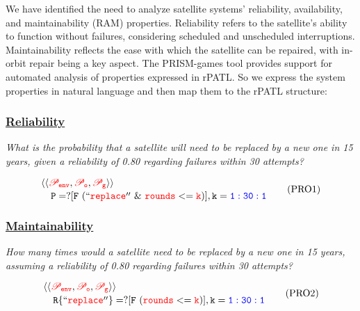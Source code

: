 We have identified the need to analyze satellite systems' reliability, availability, and maintainability (RAM) properties. Reliability refers to the satellite's ability to function without failures, considering scheduled and unscheduled interruptions. Maintainability reflects the ease with which the satellite can be repaired, with in-orbit repair being a key aspect.  The PRISM-games tool provides support for automated analysis of properties expressed in rPATL. So we express the system properties in natural language and then map them to the rPATL structure:

\subsubsection{\underline{Reliability}} 

\emph{What is the probability that a satellite will need to be replaced by a new one in 15 years, given a reliability of 0.80 regarding failures within 30 attempts?}

	   
	    \begin{resp}{}
             \begin{equation}
             \splitdfrac{\mathtt{  \langle\langle\textcolor{red}{\mathcal{P}_{env}}, \textcolor{red}{\mathcal{P}_{o}}, \textcolor{red}{\mathcal{P}_{g}}} \rangle\rangle}{ \\ \mathtt{ P=? [ F \ (\quot{\textcolor{red}{replace}} \ \& \ \textcolor{red}{rounds}<=\textcolor{red}{k}) ] ,k=\textcolor{blue}{1:30:1}}} 
        \label{eq1}
        \tag{PRO1}
    \end{equation}
        \end{resp}
        \normalsize

\subsubsection{\underline{Maintainability}} \emph{How many times would a satellite need to be replaced by a new one in 15 years, assuming a reliability of 0.80 regarding failures within 30 attempts?}

	   
	    \begin{resp}{ }
             \begin{equation}
             \splitdfrac{\mathtt{  \langle\langle\textcolor{red}{\mathcal{P}_{env}}, \textcolor{red}{\mathcal{P}_{o}}, \textcolor{red}{\mathcal{P}_{g}}} \rangle\rangle}{ \\ \mathtt{ R\{\quot{\textcolor{red}{replace}} \}=? [ F \  (\textcolor{red}{rounds}<=\textcolor{red}{k}) ] ,k=\textcolor{blue}{1:30:1}}} 
        \label{eq2}
        \tag{PRO2}
    \end{equation}
        \end{resp}
        \normalsize

